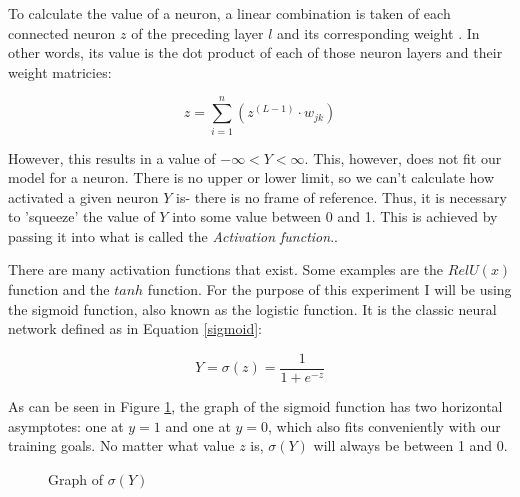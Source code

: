\documentclass[12pt]{article}
\begin{document}
To calculate the value of a neuron, a linear combination is taken of each connected neuron $z$ of the preceding layer $l$ and its corresponding weight \textcite{sharma2017}. In other words, its value is the dot product of each of those neuron layers and their weight matricies:

\begin{equation} \label{forwardpropequation}
  z = \sum_{i=1}^{n}(z^{(L-1)} \cdot w_{jk})
\end{equation}

However, this results in a value of \begin{math} -\infty < Y < \infty \end{math}. This, however, does not fit our model for a neuron. There is no upper or lower limit, so we can't calculate how activated a given neuron \(Y\) is- there is no frame of reference. Thus, it is necessary to 'squeeze' the value of \(Y\) into some value between 0 and 1. This is achieved by passing it into what is called the \textit{Activation function}.\textcite{sharma2017}.

There are many activation functions that exist. Some examples are the \(RelU(x)\) function and the \(tanh\) function. For the purpose of this experiment I will be using the sigmoid function, also known as the logistic function. It is the classic neural network \textcite{DeepLearningCh2} defined as in Equation \ref{sigmoid}:

\begin{equation} \label{sigmoid}
  Y = \sigma(z) = \frac{1}{1 + e ^ {-z}}
\end{equation}


As can be seen in Figure \ref{sigmoidgraph}, the graph of the sigmoid function has two horizontal asymptotes: one at \(y = 1\) and one at \(y = 0\), which also fits conveniently with our training goals. No matter what value $z$ is, \(\sigma(Y)\) will always be between 1 and 0.

\begin{figure}[h]
  \centering
  \caption{Graph of $\sigma(Y)$} \label{sigmoidgraph}
\end{figure}
\end{document}
